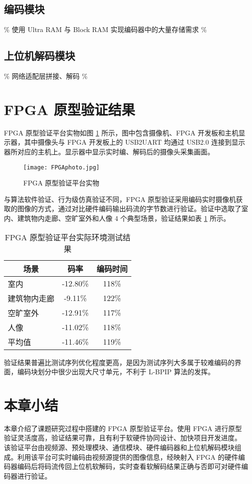 \subsection{编码模块}
\% 使用 Ultra RAM 与 Block RAM 实现编码器中的大量存储需求 \%

\subsection{上位机解码模块}
\% 网络适配层拼接、解码 \%

\section{FPGA 原型验证结果}
FPGA 原型验证平台实物如图 \ref{fig:FPGAphoto} 所示，图中包含摄像机、FPGA 开发板和主机显示器，其中摄像头与 FPGA 开发板上的 USB2UART 均通过 USB2.0 连接到显示器所对应的主机上。显示器中显示实时编、解码后的摄像头采集画面。
\begin{figure}[hbt]
    \centering
    \texttt{[image: FPGAphoto.jpg]}
    \caption{FPGA 原型验证平台实物}
    \label{fig:FPGAphoto}
\end{figure}

与算法软件验证、行为级仿真验证不同，FPGA 原型验证采用编码实时摄像机获取的图像的方式，通过对比硬件编码输出码流的字节数进行验证。验证中选取了室内、建筑物内走廊、空旷室外和人像 4 个典型场景，验证结果如表 \ref{tab:FPGADemoTestTab} 所示。
\begin{table}[hbt]
    \centering
    \caption{FPGA 原型验证平台实际环境测试结果}
    \label{tab:FPGADemoTestTab}
    \begin{tabular}{@{}lcc@{}}
        \toprule
        \multicolumn{1}{c}{场景} & 码率     & 编码时间 \\ \midrule
        室内                     & -12.80\% & 118\%    \\
        建筑物内走廊             & -9.11\%  & 122\%    \\
        空旷室外                 & -12.91\% & 117\%    \\
        人像                     & -11.02\% & 118\%    \\ \midrule
        平均值                   & -11.46\% & 119\%    \\ \bottomrule
    \end{tabular}
\end{table}

验证结果普遍比测试序列优化程度更高，是因为测试序列大多属于较难编码的界面，编码块划分中很少出现大尺寸单元，不利于 L-BPIP 算法的发挥。

\section{本章小结}
本章介绍了课题研究过程中搭建的 FPGA 原型验证平台。使用 FPGA 进行原型验证灵活度高，验证结果可靠，且有利于软硬件协同设计、加快项目开发进度。
该验证平台由视频源、预处理模块、通信模块、硬件编码器和上位机解码模块组成。利用该平台可实时编码由视频源提供的图像信息，经映射入 FPGA 的硬件编码器编码后将码流传回上位机软解码，实时查看软解码结果正确与否即可对硬件编码器进行验证。
